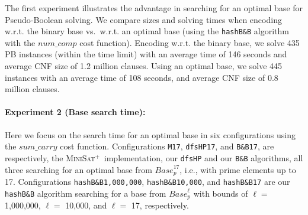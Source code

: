 \documentclass[envcountsame]{llncs}
\newcommand\minisatp{\textsc{MiniSat$^+$}}
\newcommand{\Base}{\mathit{Base}}
\newcommand{\sumCarry}{\mathit{sum\_carry}}
\newcommand{\numComparators}{\mathit{num\_comp}}
\begin{document}
The first experiment illustrates the advantage in searching for an
optimal base for Pseudo-Boolean solving. We compare sizes and
solving times when encoding w.r.t. the binary base vs.\ w.r.t. an optimal base
(using the \texttt{hashB\&B} algorithm with the $\numComparators$ cost
function).
Encoding w.r.t. the binary base, we solve 435 PB instances (within the
time limit) with an average time of 146 seconds and average CNF size
of 1.2 million clauses.
Using an optimal base, we solve 445 instances with an average time of
108 seconds, and average CNF size of 0.8 million clauses.



\paragraph{Experiment 2 (Base search time):}

Here we focus on the search time for an optimal base in six
configurations using the $\sumCarry$ cost function.
Configurations \texttt{M17}, \texttt{dfsHP17}, and \texttt{B\&B17},
are respectively, the \minisatp\ implementation, our \texttt{dfsHP}
and our \texttt{B\&B} algorithms, all three searching for an optimal
base from $\Base_p^{17}$, i.e., with prime elements up to 17.
Configurations \texttt{hashB\&B1,000,000}, \texttt{hashB\&B10,000},
and \texttt{hashB\&B17} are our \texttt{hashB\&B} algorithm 
searching for a base from $\Base_p^\ell$ with bounds of
$\ell = $ 1,000,000, $\ell =$ 10,000, and $\ell =$ 17, respectively.
\end{document}

